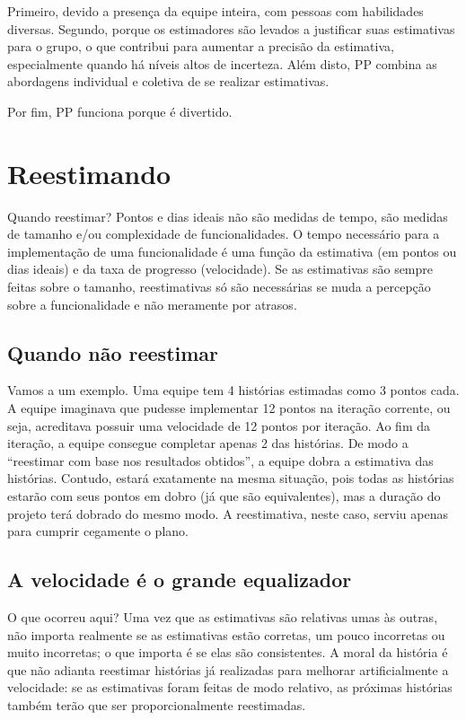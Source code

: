 \documentclass[a4paper,abntfigtabnum,noindentfirst]{abnt}
\begin{document}
Primeiro, devido a presença da equipe inteira, com pessoas com habilidades diversas. Segundo, porque os estimadores são levados a justificar suas estimativas para o grupo, o que contribui para aumentar a precisão da estimativa, especialmente quando há níveis altos de incerteza. Além disto, PP combina as abordagens individual e coletiva de se realizar estimativas.

Por fim, PP funciona porque é divertido.



\chapter{Reestimando}
\label{capitulo-reestimando}

Quando reestimar? Pontos e dias ideais não são medidas de tempo, são medidas de tamanho e/ou complexidade de funcionalidades. O tempo necessário para a implementação de uma funcionalidade é uma função da estimativa (em pontos ou dias ideais) e da taxa de progresso (velocidade). Se as estimativas são sempre feitas sobre o tamanho, reestimativas só são necessárias se muda a percepção sobre a funcionalidade e não meramente por atrasos.

\section{Quando não reestimar}

Vamos a um exemplo. Uma equipe tem 4 histórias estimadas como 3 pontos cada. A equipe imaginava que pudesse implementar 12 pontos na iteração corrente, ou seja, acreditava possuir uma velocidade de 12 pontos por iteração. Ao fim da iteração, a equipe consegue completar apenas 2 das histórias. De modo a ``reestimar com base nos resultados obtidos'', a equipe dobra a estimativa das histórias. Contudo, estará exatamente na mesma situação, pois todas as histórias estarão com seus pontos em dobro (já que são equivalentes), mas a duração do projeto terá dobrado do mesmo modo. A reestimativa, neste caso, serviu apenas para cumprir cegamente o plano.

\section{A velocidade é o grande equalizador}

O que ocorreu aqui? Uma vez que as estimativas são relativas umas às outras, não importa realmente se as estimativas estão corretas, um pouco incorretas ou muito incorretas; o que importa é se elas são consistentes. A moral da história é que não adianta reestimar histórias já realizadas para melhorar artificialmente a velocidade: se as estimativas foram feitas de modo relativo, as próximas histórias também terão que ser proporcionalmente reestimadas.
\end{document}
